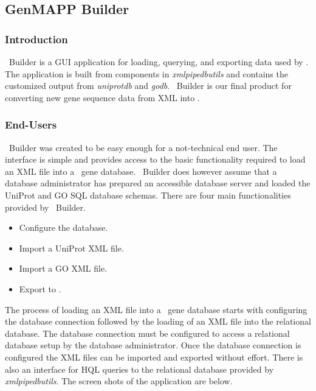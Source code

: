 \subsection{GenMAPP Builder}
\label{gmbuilder}

\subsubsection{Introduction}
\genmapp~Builder is a GUI application for loading, querying, and exporting data
used by \genmapp. The application is built from components in \emph{xmlpipedbutils} and contains the customized output from \emph{uniprotdb} and \emph{godb}. \genmapp~Builder is our final product for converting new gene sequence data from XML into \genmapp.

\subsubsection{End-Users}
\genmapp~Builder was created to be easy enough for a not-technical end user.  The interface is simple and provides access to the basic functionality required to load an XML file into a \genmapp~gene database.  \genmapp~Builder does however assume that a database administrator has prepared an accessible database server and loaded the UniProt and GO SQL database schemas.  There are four main functionalities provided by \genmapp~Builder.
\begin{itemize}
	\item {Configure the database.}
	\item {Import a UniProt XML file. }
	\item {Import a GO XML file.}
	\item {Export to \genmapp.}
\end{itemize}
The process of loading an XML file into a \genmapp~gene database starts with configuring the database connection followed by the loading of an XML file into the relational database.  The database connection must be configured to access a relational database setup by the database administrator.  Once the database connection is configured the XML files can be imported and exported without effort.  There is also an interface for HQL queries to the relational database provided by \emph{xmlpipedbutils}.  The screen shots of the application are below.

